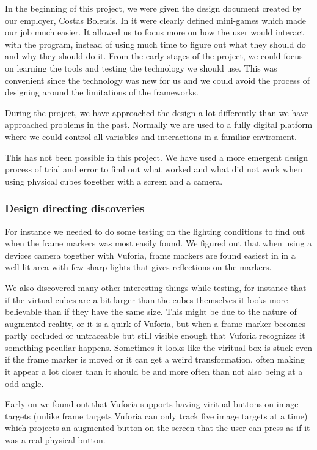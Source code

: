 In the beginning of this project, we were given the design document created by our employer, Costas Boletsis. In it were clearly defined mini-games which made our job much easier. It allowed us to focus more on how the user would interact with the program, instead of using much time to figure out what they should do and why they should do it. From the early stages of the project, we could focus on learning the tools and testing the technology we should use. This was convenient since the technology was new for us and we could avoid the process of designing around the limitations of the frameworks.

During the project, we have approached the design a lot differently than we have approached problems in the past. Normally we are used to a fully digital platform where we could control all variables and interactions in a familiar enviroment.

This has not been possible in this project. We have used a more emergent design process of trial and error to find out what worked and what did not work when using physical cubes together with a screen and a camera.

\subsubsection{Design directing discoveries}
For instance we needed to do some testing on the lighting conditions to find out when the frame markers was most easily found. We figured out that when using a devices camera together with Vuforia, frame markers are found easiest in in a well lit area with few sharp lights that gives reflections on the markers.

We also discovered many other interesting things while testing, for instance that if the virtual cubes are a bit larger than the cubes themselves it looks more believable than if they have the same size. 
This might be due to the nature of augmented reality, or it is a quirk of Vuforia, but when a frame marker becomes partly occluded or untraceable but still visible enough that Vuforia recognizes it something peculiar happens.
Sometimes it looks like the viritual box is stuck even if the frame marker is moved or it can get a weird transformation, often making it appear a lot closer than it should be and more often than not also being at a odd angle.


Early on we found out that Vuforia supports having viritual buttons on image targets (unlike frame targets Vuforia can only track five image targets at a time) which projects an augmented button on the screen that the user can press as if it was a real physical button.

